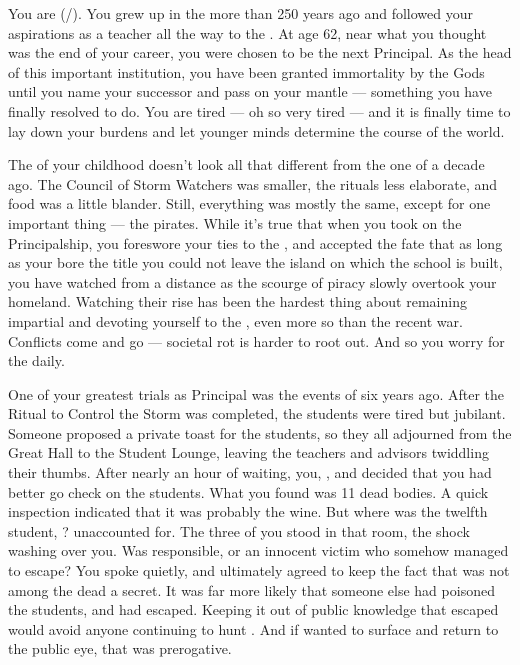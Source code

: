 \documentclass[char]{GL2020}
\begin{document}
\name{\cPrincipal{}}

You are \cPrincipal{\full} (\cPrincipal{\they}/\cPrincipal{\them}). You grew up in the \pShip{} more than 250 years ago and followed your aspirations as a teacher all the way to the \pSchool{}. At age 62, near what you thought was the end of your career, you were chosen to be the next Principal. As the head of this important institution, you have been granted immortality by the Gods until you name your successor and pass on your mantle — something you have finally resolved to do. You are tired — oh so very tired — and it is finally time to lay down your burdens and let younger minds determine the course of the world.

The \pShip{} of your childhood doesn't look all that different from the one of a decade ago. The Council of Storm Watchers was smaller, the rituals less elaborate, and food was a little blander. Still, everything was mostly the same, except for one important thing — the pirates. While it's true that when you took on the Principalship, you foreswore your ties to the \pShippies{}, and accepted the fate that as long as your bore the title you could not leave the island on which the school is built, you have watched from a distance as the scourge of piracy slowly overtook your homeland. Watching their rise has been the hardest thing about remaining impartial and devoting yourself to the \pSc{}, even more so than the recent war. Conflicts come and go — societal rot is harder to root out. And so you worry for the \pShip{} daily.

One of your greatest trials as Principal was the events of six years ago. After the Ritual to Control the Storm was completed, the students were tired but jubilant. Someone proposed a private toast for the students, so they all adjourned from the Great Hall to the Student Lounge, leaving the teachers and advisors twiddling their thumbs. After nearly an hour of waiting, you, \cDiplomat{\full}, and \cMusic{\full} decided that you had better go check on the students. What you found was 11 dead bodies. A quick inspection indicated that it was probably the wine. But where was the twelfth student, \cKidScientist{\full}? \cKidScientist{\Theywere} unaccounted for. The three of you stood in that room, the shock washing over you. Was \cKidScientist{} responsible, or \cKidScientist{\were} \cKidScientist{\they} an innocent victim who somehow managed to escape? You spoke quietly, and ultimately agreed to keep the fact that \cKidScientist{} was not among the dead a secret. It was far more likely that someone else had poisoned the students, and \cKidScientist{} had escaped. Keeping it out of public knowledge that \cKidScientist{\they} escaped would avoid anyone continuing to hunt \cKidScientist{\them}. And if \cKidScientist{\they} wanted to surface and return to the public eye, that was \cKidScientist{\their} prerogative.
\end{document}
